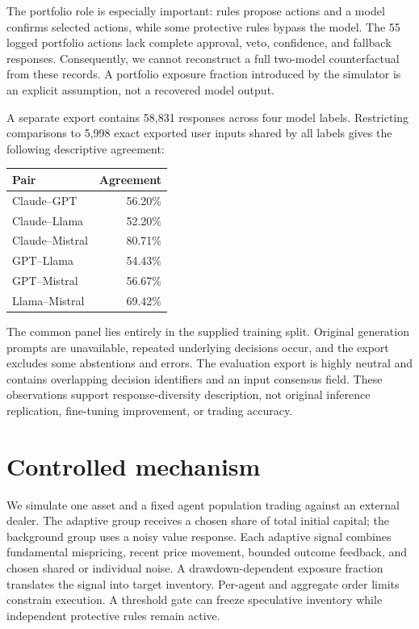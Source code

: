 \documentclass[10pt,letterpaper,twocolumn]{article}
\begin{document}
The portfolio role is especially important: rules propose actions and a model confirms selected actions, while some protective rules bypass the model. The 55 logged portfolio actions lack complete approval, veto, confidence, and fallback responses. Consequently, we cannot reconstruct a full two-model counterfactual from these records. A portfolio exposure fraction introduced by the simulator is an explicit assumption, not a recovered model output.

A separate export contains 58,831 responses across four model labels. Restricting comparisons to 5,998 exact exported user inputs shared by all labels gives the following descriptive agreement:
\begin{center}\small
\begin{tabular}{lr}\toprule
Pair & Agreement\\\midrule
Claude--GPT & 56.20\%\\
Claude--Llama & 52.20\%\\
Claude--Mistral & 80.71\%\\
GPT--Llama & 54.43\%\\
GPT--Mistral & 56.67\%\\
Llama--Mistral & 69.42\%\\\bottomrule
\end{tabular}
\end{center}
The common panel lies entirely in the supplied training split. Original generation prompts are unavailable, repeated underlying decisions occur, and the export excludes some abstentions and errors. The evaluation export is highly neutral and contains overlapping decision identifiers and an input consensus field. These observations support response-diversity description, not original inference replication, fine-tuning improvement, or trading accuracy.

\section{Controlled mechanism}
We simulate one asset and a fixed agent population trading against an external dealer. The adaptive group receives a chosen share of total initial capital; the background group uses a noisy value response. Each adaptive signal combines fundamental mispricing, recent price movement, bounded outcome feedback, and chosen shared or individual noise. A drawdown-dependent exposure fraction translates the signal into target inventory. Per-agent and aggregate order limits constrain execution. A threshold gate can freeze speculative inventory while independent protective rules remain active.
\end{document}
